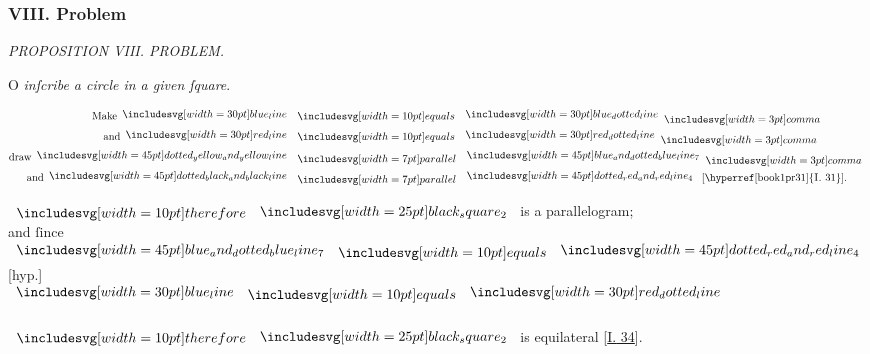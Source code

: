 \documentclass[12pt,preview]{standalone}
\begin{document}
\subsubsection{VIII. Problem}

\begin{minipage}[t]{0.33\textwidth}
    \vspace{40pt}
    
\end{minipage}%
\hfill
\begin{minipage}[t]{0.64\textwidth}
    \vspace{0pt}

    \begin{center}
        \textit{PROPOSITION VIII. PROBLEM.}\label{book4pr8} \\
    \end{center}

    \hfill

    \begin{center}
        \raggedright \lettrine[lines=4, loversize=1, nindent=0pt]{}{}O \textit{inſcribe a circle in a given ſquare}.
    \end{center}

    \hfill

    \hfill

    \begin{center}
        \begin{align*}
            \text{Make} \blueline                            & \bequals \dottedblueline \bcomma                                                            \\
            \text{and} \redline                              & \bequals \dottedredline \bcomma                                                             \\
            \text{draw} \bimg{dotted_yellow_and_yellow_line} & \bparallel  \bimg{blue_and_dotted_blue_line_7} \bcomma                                      \\
            \text{and} \bimg{dotted_black_and_black_line}    & \bparallel \bimg{dotted_red_and_red_line_4} \text{ [\hyperref[book1pr31]{\textsc{I.} 31}].}
        \end{align*}
    \end{center}

    \begin{center}
        $\btherefore \img{black_square_2}$ is a parallelogram;\\
        and ſince $\bimg{blue_and_dotted_blue_line_7} \bequals \bimg{dotted_red_and_red_line_4}$ [hyp.]\\
        $\blueline \bequals \dottedredline$\\
        \hfill\\
        $\btherefore \img{black_square_2}$ is equilateral [\hyperref[book1pr34]{\textsc{I.} 34}].
    \end{center}


\end{minipage}
\end{document}
